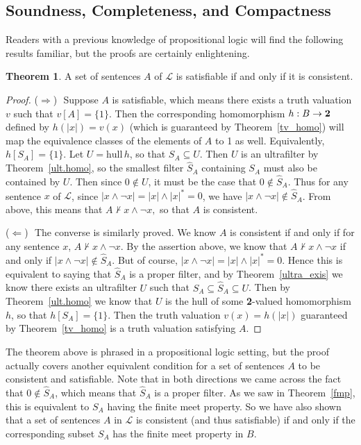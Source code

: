 \documentclass[11pt,titlepage]{article}
\newcommand{\hull}{\text{hull}\,}
\newcommand{\Lan}{\mathcal{L}}
\newcommand{\forward}{\noindent ($\Longrightarrow$) \,\,}
\newcommand{\back}{\noindent ($\Longleftarrow$) \,\,}
\theoremstyle{definition}
\newtheorem{theorem}[definition]{Theorem}
\begin{document}
\subsection{Soundness, Completeness, and Compactness}\label{result}
Readers with a previous knowledge of propositional logic will find the following results familiar, but the proofs are certainly enlightening.


\begin{theorem}\label{con_sat} A set of sentences $A$ of $\Lan$ is satisfiable if and only if it is consistent.\end{theorem}

\begin{proof} \forward Suppose $A$ is satisfiable, which means there exists a truth valuation $v$ such that $v[A]=\{1\}.$ Then the corresponding homomorphism $h: B\to {\bf 2}$ defined by $h(|x|)=v(x)$ (which is guaranteed by Theorem~\ref{tv_homo}) will map the equivalence classes of the elements of $A$ to 1 as well. Equivalently, $h[S_A]=\{1\}$. Let $U=\hull h$, so that $S_A\subseteq U$. Then $U$ is an ultrafilter by Theorem~\ref{ult.homo}, so the smallest filter $\hat{S}_A$ containing $S_A$ must also be contained by $U$. Then since $0\notin U$, it must be the case that $0\notin\hat{S}_A.$ Thus for any sentence $x$ of $\Lan$, since $|x\land \neg x|= |x|\land|x|^*=0$, we have $|x\land \neg x| \notin\hat{S}_A$. From above, this means that $A\nvdash x\land \neg x,$ so that $A$ is consistent.

\back The converse is similarly proved. We know $A$ is consistent if and only if for any sentence $x$, $A\nvdash x\land \neg x$. By the assertion above, we know that $A\nvdash x\land\neg x$ if and only if $|x\land\neg x| \notin \hat{S}_A$. But of course, $|x\land\neg x|=|x|\land|x|^* = 0$. Hence this is equivalent to saying that $\hat{S}_A$ is a proper filter, and by Theorem~\ref{ultra_exis} we know there exists an ultrafilter $U$ such that $S_A\subseteq\hat{S}_A\subseteq U$. Then by Theorem~\ref{ult.homo} we know that $U$ is the hull of some {\bf 2}-valued homomorphism $h$, so that $h[S_A]=\{1\}$. Then the truth valuation $v(x)=h(|x|)$ guaranteed by Theorem~\ref{tv_homo} is a truth valuation satisfying $A$. \end{proof}

The theorem above is phrased in a propositional logic setting, but the proof actually covers another equivalent condition for a set of sentences $A$ to be consistent and satisfiable. Note that in both directions we came across the fact that $0\notin\hat{S}_A$, which means that $\hat{S}_A$ is a proper filter. As we saw in Theorem~\ref{fmp}, this is equivalent to $S_A$ having the finite meet property. So we have also shown that a set of sentences $A$ in $\Lan$ is consistent (and thus satisfiable) if and only if the corresponding subset $S_A$ has the finite meet property in $B$.
\end{document}
